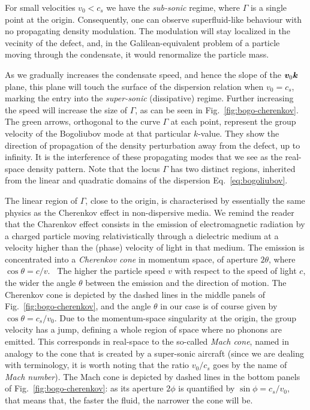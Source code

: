 For small velocities $v_0 < c_s$ we have the \textit{sub-sonic}
regime, where $\Gamma$ is a single point at the origin. Consequently,
one can observe superfluid-like behaviour with no propagating density
modulation. The modulation will stay localized in the vecinity of the
defect, and, in the Galilean-equivalent problem of a particle moving
through the condensate, it would renormalize the particle
mass.~\cite{Astrakharchik_2004}

As we gradually increases the condensate speed, and hence the slope of
the $\bm{v}_0 \bm{k}$ plane, this plane will touch the surface of the
dispersion relation when $v_0 = c_s$, marking the entry into the
\textit{super-sonic} (dissipative) regime. Further increasing the
speed will increase the size of $\Gamma$, as can be seen in
Fig.~\ref{fig:bogo-cherenkov}. The green arrows, orthogonal to the
curve $\Gamma$ at each point, represent the group velocity of the
Bogoliubov mode at that particular $k$-value. They show the direction
of propagation of the density perturbation away from the defect, up to
infinity. It is the interference of these propagating modes that we
see as the real-space density pattern. Note that the locus $\Gamma$
has two distinct regions, inherited from the linear and quadratic
domains of the dispersion Eq.~\eqref{eq:bogoliubov}.

The linear region of $\Gamma$, close to the origin, is characterised
by essentially the same physics as the Cherenkov effect in
non-dispersive media. We remind the reader that the Charenkov effect
consists in the emission of electromagnetic radiation by a charged
particle moving relativistically through a dielectric medium at a
velocity higher than the (phase) velocity of light in that medium. The
emission is concentrated into a \textit{Cherenkov cone} in momentum
space, of aperture $2\theta$, where
$\cos\theta = c/v$.~\cite{jelley1958vcerenkov} The higher the particle
speed $v$ with respect to the speed of light $c$, the wider the angle
$\theta$ between the emission and the direction of motion. The
Cherenkov cone is depicted by the dashed lines in the middle panels of
Fig.~\ref{fig:bogo-cherenkov}, and the angle $\theta$ in our case is
of course given by $\cos\theta = c_s/v_0$. Due to the momentum-space
singularity at the origin, the group velocity has a jump, defining a
whole region of space where no phonons are emitted. This corresponds
in real-space to the so-called \textit{Mach cone}, named in analogy to
the cone that is created by a super-sonic aircraft (since we are
dealing with terminology, it is worth noting that the ratio $v_0/c_s$
goes by the name of \textit{Mach number}). The Mach cone is depicted
by dashed lines in the bottom panels of Fig.~\ref{fig:bogo-cherenkov}:
as its aperture $2\phi$ is quantified by $\sin\phi = c_s/v_0$, that
means that, the faster the fluid, the narrower the cone will be.

